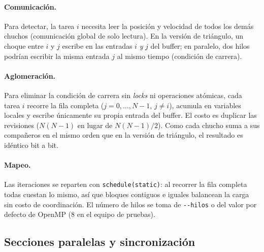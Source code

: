 \documentclass[11pt,letterpaper]{article}
\newcommand{\codigo}[1]{\texttt{#1}}
\begin{document}
\paragraph{Comunicación.} Para detectar, la tarea $i$ necesita leer la
posición y velocidad de todos los demás chuchos (comunicación global de solo
lectura). En la versión de triángulo, un choque entre $i$ y $j$ escribe en las
entradas $i$ \emph{y} $j$ del buffer; en paralelo, dos hilos podrían escribir
la misma entrada $j$ al mismo tiempo (condición de carrera).

\paragraph{Aglomeración.} Para eliminar la condición de carrera sin
\emph{locks} ni operaciones atómicas, cada tarea $i$ recorre la fila completa
($j=0,\dots,N-1$, $j\neq i$), acumula en variables locales y escribe
únicamente su propia entrada del buffer. El costo es duplicar las revisiones
($N(N-1)$ en lugar de $N(N-1)/2$). Como cada chucho suma a sus compañeros en el
mismo orden que en la versión de triángulo, el resultado es idéntico bit a bit.

\paragraph{Mapeo.} Las iteraciones se reparten con
\codigo{schedule(static)}: al recorrer la fila completa todas cuestan lo mismo,
así que bloques contiguos e iguales balancean la carga sin costo de
coordinación. El número de hilos se toma de \codigo{-{}-hilos} o del valor por
defecto de OpenMP (8 en el equipo de pruebas).

\subsection{Secciones paralelas y sincronización}
\end{document}
